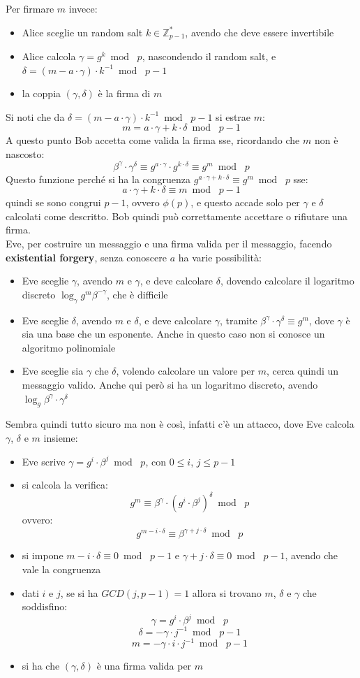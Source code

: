 \documentclass[a4paper,12pt, oneside]{book}
\begin{document}
Per firmare $m$ invece:
\begin{itemize}
  \item Alice sceglie un random salt $k\in\mathbb{Z}_{p-1}^*$, avendo che deve
  essere invertibile
  \item Alice calcola $\gamma=g^k\bmod\,\,p$, nascondendo il random salt, e
  $\delta=(m-a\cdot \gamma)\cdot k^{-1}\bmod \,\,p-1$
  \item la coppia $(\gamma,\delta)$ è la firma di $m$
\end{itemize}
Si noti che da  $\delta=(m-a\cdot \gamma)\cdot k^{-1}\bmod \,\,p-1$ si estrae
$m$:
\[m=a\cdot \gamma+k\cdot \delta\bmod \,\,p-1\]
A questo punto Bob accetta come valida la firma sse, ricordando che $m$ non è
nascosto: 
\[\beta^\gamma\cdot \gamma^\delta\equiv g^{a\cdot \gamma}\cdot
  g^{k\cdot\delta}\equiv g^m\bmod\,\,p\]
Questo funzione perché si ha la congruenza $g^{a\cdot \gamma+k\cdot\delta}\equiv
g^m\bmod \,\,p$ sse: 
\[a\cdot \gamma+k\cdot \delta\equiv m\bmod\,\,p-1\]
quindi se sono congrui $p-1$, ovvero $\phi(p)$,
e questo accade solo per $\gamma$ e $\delta$ calcolati come descritto. Bob
quindi può correttamente accettare o rifiutare una firma.\\
Eve, per costruire un messaggio e una firma valida per il messaggio, facendo
\textbf{existential forgery}, senza conoscere $a$ ha varie possibilità:
\begin{itemize}
  \item Eve sceglie $\gamma$, avendo $m$ e $\gamma$, e deve calcolare $\delta$,
  dovendo calcolare il logaritmo discreto $\log_\gamma g^m\beta^{-\gamma}$, che
  è difficile
  \item Eve sceglie $\delta$, avendo $m$ e $\delta$, e deve calcolare $\gamma$,
  tramite $\beta^\gamma\cdot \gamma^\delta\equiv g^m$, dove $\gamma$ è sia una
  base che un esponente. Anche in questo caso non si conosce un algoritmo
  polinomiale
  \item Eve sceglie sia $\gamma$ che $\delta$, volendo calcolare un valore per
  $m$, cerca quindi un messaggio valido. Anche qui però si ha un logaritmo
  discreto, avendo $\log_g\beta^\gamma\cdot \gamma^\delta$
\end{itemize}
Sembra quindi tutto sicuro ma non è così, infatti c'è un attacco, dove Eve
calcola $\gamma$, $\delta$ e $m$ insieme: 
\begin{itemize}
  \item Eve scrive $\gamma=g^i\cdot \beta^j\bmod\,\,p$, con $0\leq i$, $j\leq
  p-1$ 
  \item si calcola la verifica:
  \[g^m\equiv \beta^\gamma\cdot (g^i\cdot \beta^j)^\delta\bmod\,\,p\]
  ovvero:
  \[g^{m-i\cdot\delta}\equiv \beta^{\gamma+j\cdot \delta}\bmod\,\,p\]
  \item si impone $m-i\cdot \delta\equiv 0\bmod\,\,p-1$ e $\gamma+j\cdot
  \delta\equiv 0\bmod\,\,p-1$, avendo che vale la congruenza
  \item dati $i$ e $j$, se si ha $GCD(j,p-1)=1$ allora si trovano $m$, $\delta$
  e $\gamma$ che soddisfino:
  \[\gamma=g^i\cdot \beta^j\bmod\,\,p\]
  \[\delta=-\gamma\cdot j^{-1}\bmod\,\,p-1\]
  \[m=-\gamma\cdot i\cdot j^{-1}\bmod\,\,p-1\]
  \item si ha che $(\gamma,\delta)$ è una firma valida per $m$
\end{itemize}
\end{document}
